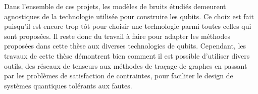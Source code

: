Dans l'ensemble de ces projets,
les modèles de bruits étudiés demeurent agnostiques de la technologie utilisée pour construire
les qubits.
Ce choix est fait puisqu'il est encore trop tôt pour choisir une technologie parmi toutes celles
qui sont proposées.
Il reste donc du travail à faire pour adapter les méthodes proposées dans cette thèse aux diverses 
technologies de qubits.
Cependant,
les travaux de cette thèse démontrent bien comment il est possible d'utiliser divers outils,
des réseaux de tenseurs aux méthodes de traçage de graphes en passant par les problèmes de satisfaction
de contraintes,
pour faciliter le design de systèmes quantiques tolérants aux fautes.
